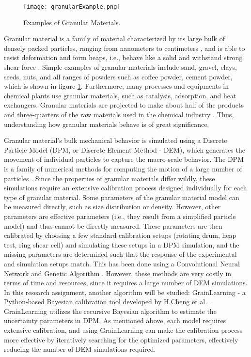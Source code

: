 \documentclass[../BachelorAssignment.tex]{subfiles}
\begin{document}
\graphicspath{{\subfix{../Images/}}}

\begin{figure}[H]
    \centering
    \texttt{[image: granularExample.png]}
    \caption{Examples of Granular Materials.\cite{granularExample}}
    \label{fig:granularExample}
\end{figure}


 Granular material is a family of material characterized by its large bulk of densely packed particles, ranging from nanometers to centimeters \cite{introGranular2}, and is able to resist deformation and form heaps, i.e., behave like a solid and withstand strong shear force \cite{introGranular3}. Simple examples of granular materials include sand, gravel, clays, seeds, nuts, and all ranges of powders such as coffee powder, cement powder, which is shown in figure \ref{fig:granularExample}. Furthermore, many processes and equipments in chemical plants use granular materials, such as catalysis, adsorption, and heat exchangers. Granular materials are projected to make about half of the products and three-quarters of the raw materials used in the chemical industry \cite{introGranular}. Thus, understanding how granular materials behave is of great significance. 


Granular material's bulk mechanical behavior is simulated using a Discrete Particle Model (DPM, or Discrete Element Method - DEM), which generates the movement of individual particles to capture the macro-scale behavior. The DPM is a family of numerical methods for computing the motion of a large number of particles \cite{Weng:2015}. Since the properties of granular materials differ wildly, these simulations require an extensive calibration process designed individually for each type of granular material. Some parameters of the granular material model can be measured directly, such as size distribution or density. However, other parameters are effective parameters (i.e., they result from a simplified particle model) and thus cannot be directly measured. These parameters are then calibrated by choosing a few standard calibration setups (rotating drum, heap test, ring shear cell) and simulating these setups in a DPM simulation, and the missing parameters are determined such that the response of the experimental and simulation setups match. This has been done using a Convolutional Neural Network \cite{nn-calibration} and Genetic Algorithm \cite{ga-calibration}. However, these methods are very costly in terms of  time and resources, since it requires a large number of DEM simulations. In this research assignment, another algorithm will be studied: GrainLearning - a Python-based Bayesian calibration tool developed by H.Cheng et al. \cite{grainLearning}. GrainLearning utilizes the recursive Bayesian algorithm to estimate the uncertainty parameters in DPM. As mentioned above, each model requires extensive calibration, and using GrainLearning can make the calibration process more effective by iteratively searching for the optimized parameters, effectively reducing the number of DEM simulations required.
\end{document}
